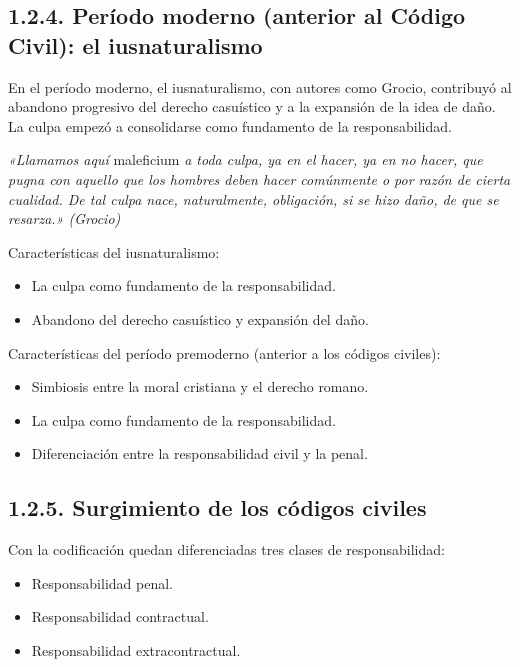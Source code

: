 \subsection{1.2.4. Período moderno (anterior al Código Civil): el iusnaturalismo}
En el período moderno, el iusnaturalismo, con autores como Grocio, contribuyó al abandono progresivo del derecho casuístico y a la expansión de la idea de daño. La culpa empezó a consolidarse como fundamento de la responsabilidad.

\begin{cita}
\textit{«Llamamos aquí }maleficium\textit{ a toda culpa, ya en el hacer, ya en no hacer, que pugna con aquello que los hombres deben hacer comúnmente o por razón de cierta cualidad. De tal culpa nace, naturalmente, obligación, si se hizo daño, de que se resarza.» (Grocio)}
\end{cita}
Características del iusnaturalismo:

\begin{itemize}
\item La culpa como fundamento de la responsabilidad.
\item Abandono del derecho casuístico y expansión del daño.
\end{itemize}
Características del período premoderno (anterior a los códigos civiles):

\begin{itemize}
\item Simbiosis entre la moral cristiana y el derecho romano.
\item La culpa como fundamento de la responsabilidad.
\item Diferenciación entre la responsabilidad civil y la penal.
\end{itemize}
\subsection{1.2.5. Surgimiento de los códigos civiles}
Con la codificación quedan diferenciadas tres clases de responsabilidad:

\begin{itemize}
\item Responsabilidad penal.
\item Responsabilidad contractual.
\item Responsabilidad extracontractual.
\end{itemize}
